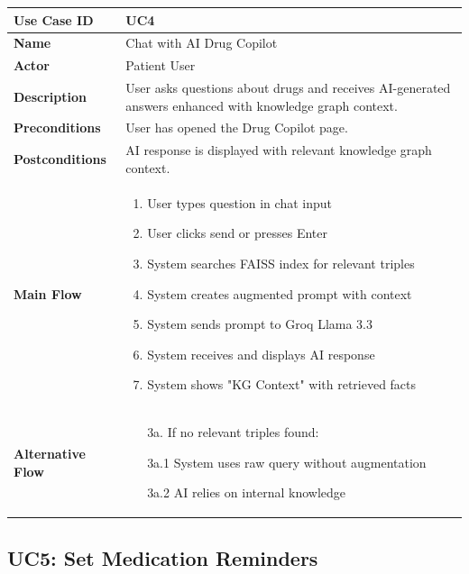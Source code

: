 \documentclass[12pt,a4paper]{report}
\begin{document}
\begin{tabularx}{\textwidth}{|l|X|}
\hline
\textbf{Use Case ID} & UC4 \\
\hline
\textbf{Name} & Chat with AI Drug Copilot \\
\hline
\textbf{Actor} & Patient User \\
\hline
\textbf{Description} & User asks questions about drugs and receives AI-generated answers enhanced with knowledge graph context. \\
\hline
\textbf{Preconditions} & User has opened the Drug Copilot page. \\
\hline
\textbf{Postconditions} & AI response is displayed with relevant knowledge graph context. \\
\hline
\textbf{Main Flow} & 
\begin{enumerate}[nosep]
    \item User types question in chat input
    \item User clicks send or presses Enter
    \item System searches FAISS index for relevant triples
    \item System creates augmented prompt with context
    \item System sends prompt to Groq Llama 3.3
    \item System receives and displays AI response
    \item System shows "KG Context" with retrieved facts
\end{enumerate} \\
\hline
\textbf{Alternative Flow} & 
\begin{enumerate}[nosep]
    \item[3a.] If no relevant triples found:
    \item[3a.1] System uses raw query without augmentation
    \item[3a.2] AI relies on internal knowledge
\end{enumerate} \\
\hline
\end{tabularx}

\subsection{UC5: Set Medication Reminders}
\end{document}
